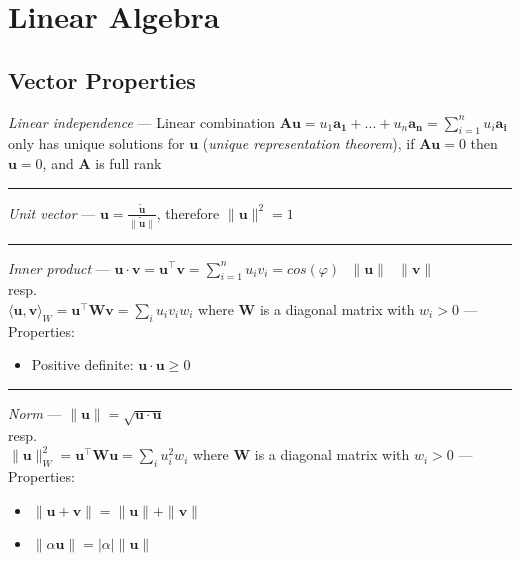 \section{Linear Algebra}
\subsection*{Vector Properties}
\emph{Linear independence} --- Linear combination $\boldsymbol{A}\boldsymbol{u} = u_1 \boldsymbol{a_1} + ... + u_n \boldsymbol{a_n} = \sum_{i=1}^n u_i \boldsymbol{a_i}$ only has unique solutions for $\boldsymbol{u}$ (\emph{unique representation theorem}), if $\boldsymbol{A}\boldsymbol{u}=0$ then  $\boldsymbol{u}=0$, and $\boldsymbol{A}$ is full rank

{\color{lightgray}\hrule height 0.001mm}

\emph{Unit vector} --- $\boldsymbol{u} = \frac{\boldsymbol{\tilde{u}}}{\|\boldsymbol{\tilde{u}}\|}$, therefore $\|\boldsymbol{u}\|^2 = 1$

{\color{lightgray}\hrule height 0.001mm}

\emph{Inner product} --- $\boldsymbol{u} \cdot \boldsymbol{v} = \boldsymbol{u}^\intercal\boldsymbol{v} = \sum_{i=1}^n u_i v_i = cos(\varphi) \textrm{ } \|\boldsymbol{u}\| \textrm{ } 
 \|\boldsymbol{v}\|$ \\
resp.\\
$\langle \boldsymbol{u}, \boldsymbol{v} \rangle_W = \boldsymbol{u}^\intercal \boldsymbol{W} \boldsymbol{v} = \sum_i u_i v_i w_i $ where $\boldsymbol{W}$ is a diagonal matrix with $w_i > 0$ --- 
Properties:
\begin{itemize}
    \item Positive definite: $\boldsymbol{u} \cdot \boldsymbol{u} \geq 0$
\end{itemize}

{\color{lightgray}\hrule height 0.001mm}

\emph{Norm} --- 
$\|\boldsymbol{u}\| = \sqrt{\boldsymbol{u} \cdot \boldsymbol{u}}$\\
resp.\\
$\|\boldsymbol{u}\|_W^2 = \boldsymbol{u}^\intercal \boldsymbol{W} \boldsymbol{u} = \sum_i u_i^2 w_i$ where $\boldsymbol{W}$ is a diagonal matrix with $w_i > 0$ --- 
Properties:
\begin{multicols}{2}
\begin{itemize}
    \item $\|\boldsymbol{u}+\boldsymbol{v}\| = \|\boldsymbol{u}\| + \| \boldsymbol{v}\|$
    \item $\|\alpha\boldsymbol{u}\| = |\alpha| \|\boldsymbol{u}\|$
\end{itemize}
\end{multicols}

